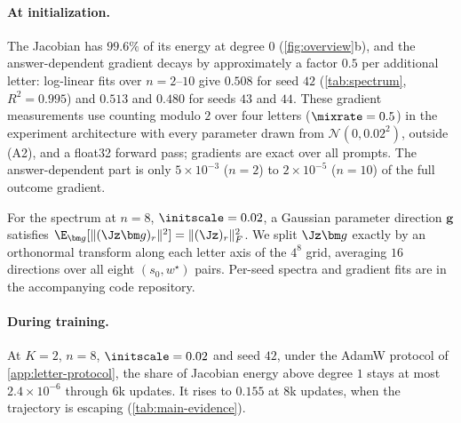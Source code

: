 \paragraph{At initialization.} The Jacobian has $99.6\%$ of its energy at degree $0$ (\cref{fig:overview}b), and the answer-dependent
gradient decays by approximately a factor $0.5$ per additional letter: log-linear fits over $n=2$--$10$ give $0.508$ for seed $42$
(\cref{tab:spectrum}, $R^2=0.995$) and $0.513$ and $0.480$ for seeds $43$ and $44$. These gradient measurements use
counting modulo $2$ over four letters ($\mixrate=0.5$) in the experiment architecture with every parameter drawn from
$\mathcal N(0,0.02^2)$, outside (A2), and a float32 forward pass; gradients are exact over all prompts. The answer-dependent part is only
$5\times10^{-3}$ ($n=2$) to $2\times10^{-5}$ ($n=10$) of the full outcome gradient.

For the spectrum at $n=8$, $\initscale=0.02$, a Gaussian parameter direction $\bm g$ satisfies
$\E_{\bm g}[\|(\Jz\bm g)_r\|^2]=\|(\Jz)_r\|_F^2$.
We split $\Jz\bm g$ exactly by an orthonormal transform along each letter axis of the $4^8$ grid,
averaging $16$ directions over all eight $(s_0,w^\star)$ pairs. Per-seed spectra and gradient fits are in the accompanying code repository.

\begin{table}[H]
\centering\small
{}
\caption{\textbf{The answer-dependent gradient decays with horizon while the step gradient does not.} Gradient norms at initialization,
seed $42$.}
\label{tab:spectrum}
\label{tab:spectrum-full}
\end{table}

\paragraph{During training.} At $K=2$, $n=8$, $\initscale=0.02$ and seed $42$, under the AdamW protocol of \cref{app:letter-protocol},
the share of Jacobian energy above degree $1$ stays at most $2.4\times10^{-6}$ through $6$k updates.
It rises to $0.155$ at $8$k updates, when the trajectory is escaping (\cref{tab:main-evidence}).

